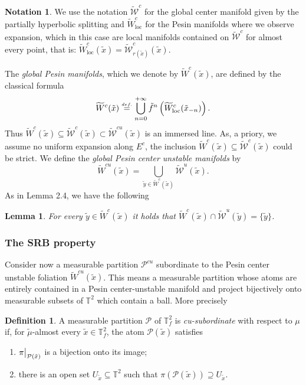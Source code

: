 \documentclass[a4paper,11pt,reqno]{amsart}
\def\tW{\widetilde W}
\newcommand\restr[2]{{ %
  \left.\kern-\nulldelimiterspace 
  #1 
  \vphantom{\big|} 
  \right|_{#2} 
  }}
\newcommand{\TT}{{\mathbb{T}^2}}
\newcommand{\TTf}{{\mathbb{T}_f^2}}
\newcommand{\loc}{{\operatorname{loc}}}
\newcommand{\cP}{{\mathcal P}}
\newcommand{\cW}{{\mathcal W}}
\newcommand{\eqdef}{\stackrel{\scriptscriptstyle\textrm def.}{=}}
\newcommand{\tix}{\tilde{x}}
\newcommand{\tif}{\tilde{f}}
\newcommand{\w}{\widetilde{\cW}}
\newtheorem{lemma}[theorem]{Lemma}
\theoremstyle{definition}
\newtheorem{definition}[theorem]{Definition}
\newtheorem*{notation}{Notation}
\begin{document}
\begin{notation}
    We use the notation $\w^c$ for the global center manifold given by the partially hyperbolic splitting and $\tW^c_{\loc}$ for the Pesin manifolds where we observe expansion, which in this case are local manifolds contained on $\w^c$ for almost every point, that is: $\tW^c_{\operatorname{loc}}(\tix)=\w^c_{r(\tix)}(\tix)$.
\end{notation}

The \emph{global Pesin manifolds}, which we denote by $\tW^c(\tix)$, are defined by the classical formula
\[
\tW^c(\tix)\eqdef\bigcup_{n=0}^{+\infty}\tif^n\left(\tW^c_{\loc}(\tix_{-n})\right).
\]
Thus $\tW^c(\tix)\subseteq\w^c(\tix)\subset\w^{cu}(\tix)$ is an immersed line. As, a priory, we assume no uniform expansion along $E^c$, the inclusion $\tW^c(\tix)\subseteq\w^c(\tix)$ could be strict. We define the \emph{global Pesin center unstable manifolds} by 
\[
\tW^{cu}(\tix)=\bigcup_{\tilde{y}\in \tW^c(\tix)}\w^u(\tix).
\]
As in \cite{ALOS} Lemma 2.4, we have the following

\begin{lemma}
    \label{lem:coerencia}
For every $\tilde{y}\in \tW^c(\tix)$ it holds that $\tW^c(\tix)\cap\w^u(\tilde{y})=\{\tilde{y}\}$.  
\end{lemma}

\subsubsection{The SRB property}

Consider now a measurable partition $\cP^{cu}$ subordinate to the Pesin center unstable foliation $\tW^{cu}(\tix)$. This means a measurable partition whose atoms are entirely contained in a Pesin center-unstable manifold and project bijectively onto measurable subsets of $\TT$ which contain a ball. More precisely

\begin{definition}
	\label{def:subord}
	A measurable partition $\mathcal{P}$ of $\TTf$ is \emph{cu-subordinate} with respect to $\mu$ if, for $\tilde{\mu}$-almost every $\tilde{x} \in \TTf$, the atom $\mathcal{P}(\tilde{x})$ satisfies
	\begin{enumerate}
		\item $\restr{\pi}{\mathcal{P}(\tilde{x})}$ is a bijection onto its image;
		\item there is an open set $U_{\tilde{x}} \subseteq \TT$ such that  $\pi(\mathcal{P}(\tilde{x}))\supseteq U_{\tix}$.
	\end{enumerate}
\end{definition}
\end{document}
